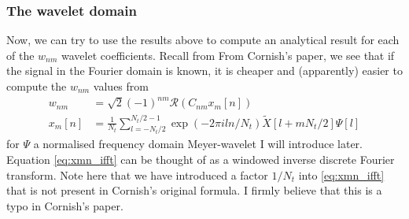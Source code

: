 \documentclass{article}
\begin{document}


\subsubsection{The wavelet domain}\label{subsubsec:monchromatic_wavelet_calculations}
Now, we can try to use the results above to compute an analytical result for each of the $w_{nm}$ wavelet coefficients. Recall from From Cornish's paper, we see that if the signal in the Fourier domain is known, it is cheaper and (apparently) easier to compute the $w_{nm}$ values from 
\begin{align}
w_{nm} &= \sqrt{2}(-1)^{nm}\mathcal{R} (C_{nm}x_{m}[n])\label{eq:w_nm}\\
x_{m}[n] & = \frac{1}{N_{t}}\sum_{l = -N_{t}/2}^{N_{t}/2 - 1} \exp(-2\pi i l n / N_{t}) \tilde{X}[l + mN_{t}/2]\Psi[l]\label{eq:xmn_ifft}
\end{align}
for $\Psi$ a normalised frequency domain Meyer-wavelet I will introduce later. Equation \eqref{eq:xmn_ifft} can be thought of as a windowed inverse discrete Fourier transform. Note here that we have introduced a factor $1/N_{t}$ into \eqref{eq:xmn_ifft} that is not present in Cornish's original formula. I firmly believe that this is a typo in Cornish's paper. 
\end{document}
